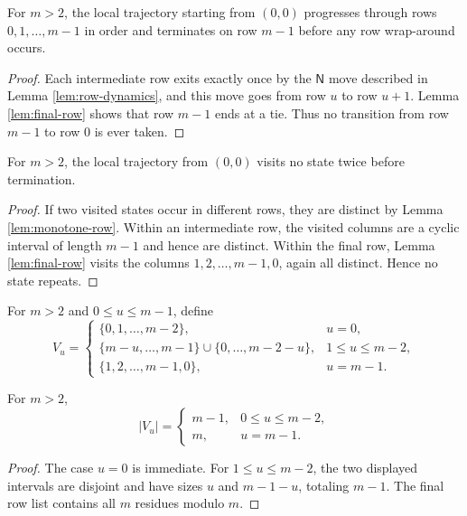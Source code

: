 \documentclass[12pt]{article}
\newcommand{\NN}{\mathsf{N}}
\begin{document}
\begin{lemma}\label{lem:monotone-row}
For $m>2$, the local trajectory starting from $(0,0)$ progresses through rows $0,1,\dots,m-1$ in order and terminates on row $m-1$ before any row wrap-around occurs.
\end{lemma}
\begin{proof}
Each intermediate row exits exactly once by the $\NN$ move described in Lemma \ref{lem:row-dynamics}, and this move goes from row $u$ to row $u+1$. Lemma \ref{lem:final-row} shows that row $m-1$ ends at a tie. Thus no transition from row $m-1$ to row $0$ is ever taken.
\end{proof}

\begin{lemma}\label{lem:local-injective}
For $m>2$, the local trajectory from $(0,0)$ visits no state twice before termination.
\end{lemma}
\begin{proof}
If two visited states occur in different rows, they are distinct by Lemma \ref{lem:monotone-row}. Within an intermediate row, the visited columns are a cyclic interval of length $m-1$ and hence are distinct. Within the final row, Lemma \ref{lem:final-row} visits the columns $1,2,\dots,m-1,0$, again all distinct. Hence no state repeats.
\end{proof}

\begin{definition}
For $m>2$ and $0\le u\le m-1$, define
\[
V_u=
\begin{cases}
\{0,1,\dots,m-2\}, & u=0,\\
\{m-u,\dots,m-1\}\cup\{0,\dots,m-2-u\}, & 1\le u\le m-2,\\
\{1,2,\dots,m-1,0\}, & u=m-1.
\end{cases}
\]
\end{definition}

\begin{lemma}\label{lem:row-cardinality}
For $m>2$,
\[
|V_u|=
\begin{cases}
m-1, & 0\le u\le m-2,\\
m, & u=m-1.
\end{cases}
\]
\end{lemma}
\begin{proof}
The case $u=0$ is immediate. For $1\le u\le m-2$, the two displayed intervals are disjoint and have sizes $u$ and $m-1-u$, totaling $m-1$. The final row list contains all $m$ residues modulo $m$.
\end{proof}
\end{document}
